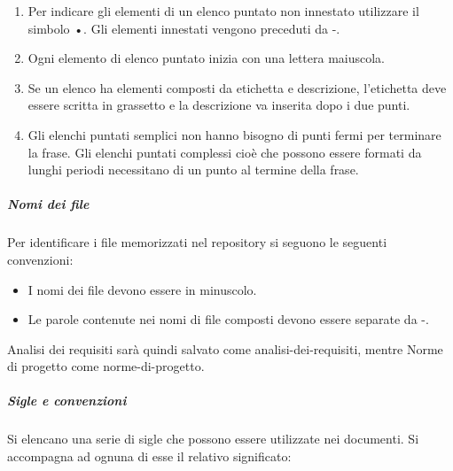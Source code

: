 \documentclass[../norme-di-progetto.tex]{subfiles}
\begin{document}
\begin{enumerate}
  \item Per indicare gli elementi di un elenco puntato non innestato utilizzare il simbolo •. Gli elementi innestati vengono preceduti da -.
  \item Ogni elemento di elenco puntato inizia con una lettera maiuscola.
  \item Se un elenco ha elementi composti da etichetta e descrizione, l'etichetta deve essere scritta in grassetto e la descrizione va inserita dopo i due punti.
  \item Gli elenchi puntati semplici non hanno bisogno di punti fermi per terminare la frase. Gli elenchi puntati complessi cioè che possono essere formati da lunghi periodi necessitano di un punto al termine della frase.
\end{enumerate}

\subparagraph{Nomi dei file}%
\label{nomi_dei_file}
Per identificare i file memorizzati nel repository si seguono le seguenti convenzioni:

\begin{itemize}
  \item I nomi dei file devono essere in minuscolo.
  \item Le parole contenute nei nomi di file composti devono essere separate da -.
\end{itemize}

Analisi dei requisiti sarà quindi salvato come analisi-dei-requisiti, mentre Norme di progetto come norme-di-progetto.

\subparagraph{Sigle e convenzioni}%
\label{sigle_e_convenzioni}
Si elencano una serie di sigle che possono essere utilizzate nei documenti. Si accompagna ad ognuna di esse il relativo significato:
\end{document}

